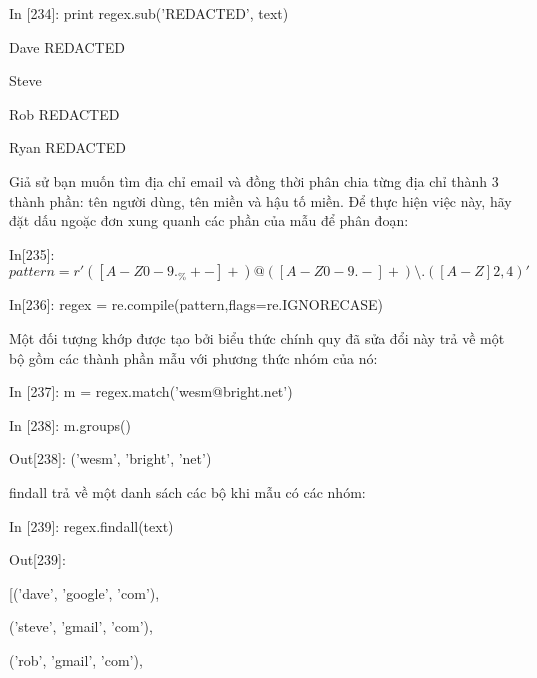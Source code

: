 \hspace{1cm}In [234]: print regex.sub('REDACTED', text)\par
\hspace{1cm}Dave REDACTED \par
\hspace{1cm}Steve  \par
\hspace{1cm}Rob REDACTED \par
\hspace{1cm}Ryan REDACTED\par
Giả sử bạn muốn tìm địa chỉ email và đồng thời phân chia từng địa chỉ thành 3 thành phần: tên người dùng, tên miền và hậu tố miền. Để thực hiện việc này, hãy đặt dấu ngoặc đơn xung quanh các phần của mẫu để phân đoạn:\par
\hspace{1cm}In\hspace{3mm}[235]:\hspace{3mm} $pattern = r'([A-Z0-9._\%+-]+)@([A-Z0-9.-]+)\setminus .([A-Z]{2,4})'$\par
\hspace{1cm}In\hspace{3mm}[236]:\hspace{3mm} regex = re.compile(pattern,flags=re.IGNORECASE)\par
Một đối tượng khớp được tạo bởi biểu thức chính quy đã sửa đổi này trả về một bộ gồm các thành phần mẫu với phương thức nhóm của nó: \par
\hspace{1cm}In [237]: m = regex.match('wesm@bright.net')\par
\hspace{1cm}In [238]: m.groups()\par
\hspace{1cm}Out[238]: ('wesm', 'bright', 'net') \par
findall trả về một danh sách các bộ khi mẫu có các nhóm:\par
\hspace{1cm}In [239]: regex.findall(text)\par
\hspace{1cm}Out[239]:\par
\hspace{1cm}[('dave', 'google', 'com'), \par
\hspace{1cm} ('steve', 'gmail', 'com'), \par
\hspace{1cm} ('rob', 'gmail', 'com'), \par
